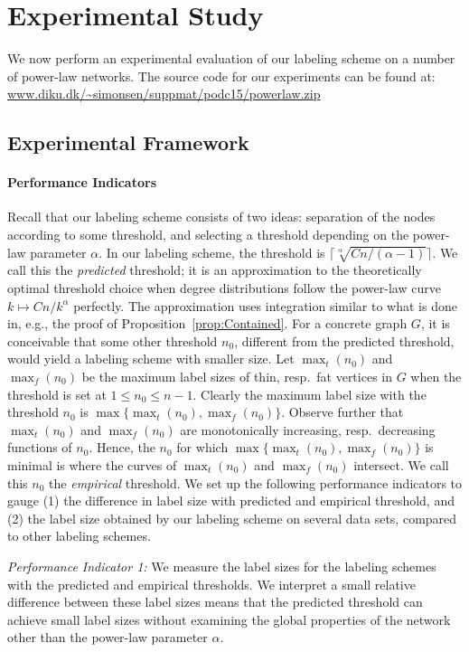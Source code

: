 \section{Experimental Study}

We now  perform an experimental evaluation of our labeling scheme on a number of power-law networks.
The source code for our experiments can be found at:\\ \url{www.diku.dk/\~simonsen/suppmat/podc15/powerlaw.zip}

\subsection{Experimental Framework}\label{Sec:Experimental}
\paragraph{Performance Indicators}
Recall that our labeling scheme consists of two ideas: separation of the nodes according to some threshold, and selecting a threshold depending on the power-law parameter $\alpha$.
In our labeling scheme, the threshold  is $\lceil \sqrt[\alpha]{C n/(\alpha-1)} \rceil$. We call this the \emph{predicted} threshold; it is an approximation to the theoretically optimal threshold choice when degree distributions follow the power-law curve $k\mapsto Cn/k^\alpha$ perfectly. The approximation uses integration similar to what is done in, e.g., the proof of Proposition~\ref{prop:Contained}.
For a concrete
graph $G$, it is conceivable that some other threshold $n_0$, different from the predicted threshold, would yield a labeling scheme with smaller size. 
Let $\max_t(n_0)$ and $\max_f(n_0)$ be the maximum label sizes of thin, resp.\ fat vertices in $G$ when the threshold is set at $1 \leq n_0 \leq n-1$. Clearly
the maximum label size with the threshold $n_0$ is $\max\{\max_t(n_0),\max_f(n_0)\}$. Observe further
that $\max_t(n_0)$ and $\max_f(n_0)$ are monotonically increasing, resp.\ decreasing functions of $n_0$. Hence,
the $n_0$ for which $\max\{\max_t(n_0),\max_f(n_0)\}$ is minimal is where the curves of $\max_t(n_0)$ and $\max_f(n_0)$ intersect. We call this $n_0$ the \emph{empirical} threshold.
We set up the following performance indicators to gauge (1) the difference in label size with predicted and empirical threshold, and (2) the label size obtained by our labeling scheme on several data sets, compared to other labeling schemes.

\emph{Performance Indicator 1:} We measure the label sizes for the labeling schemes with the predicted and empirical thresholds. We interpret a small relative difference between these label sizes means that the predicted threshold can achieve small label sizes without examining the global properties of the network other than the power-law parameter $\alpha$. 
 

